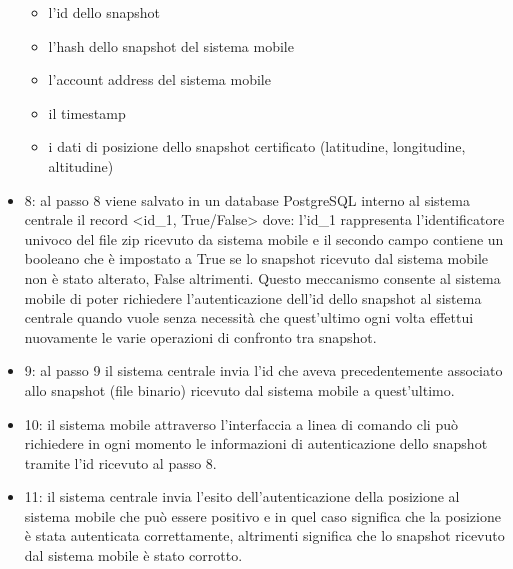 \begin{itemize}
\begin{itemize}
    \item l'id dello snapshot
    \item l'hash dello snapshot del sistema mobile
    \item l'account address del sistema mobile
    \item il timestamp
    \item i dati di posizione dello snapshot certificato (latitudine, longitudine, altitudine)
\end{itemize}
\item 8: al passo 8 viene salvato in un database PostgreSQL interno al sistema centrale il record <id\_1, True/False> dove: l’id\_1 rappresenta l’identificatore univoco del file zip ricevuto da sistema mobile e il secondo campo contiene un booleano che è impostato a True se lo snapshot ricevuto dal sistema mobile non è stato alterato, False altrimenti. Questo meccanismo consente al sistema mobile di poter richiedere l’autenticazione dell’id dello snapshot al sistema centrale quando vuole senza necessità che quest'ultimo ogni volta effettui nuovamente le varie operazioni di confronto tra snapshot.
\item 9: al passo 9 il sistema centrale invia l'id che aveva precedentemente associato allo snapshot (file binario) ricevuto dal sistema mobile a quest'ultimo.
\item 10: il sistema mobile attraverso l'interfaccia a linea di comando cli può richiedere in ogni momento le informazioni di autenticazione dello snapshot tramite l'id ricevuto al passo 8.
\item 11: il sistema centrale invia l’esito dell'autenticazione della posizione al sistema mobile che può essere positivo e in quel caso significa che la posizione è stata autenticata correttamente, altrimenti significa che lo snapshot ricevuto dal sistema mobile è stato corrotto.
\end{itemize}

